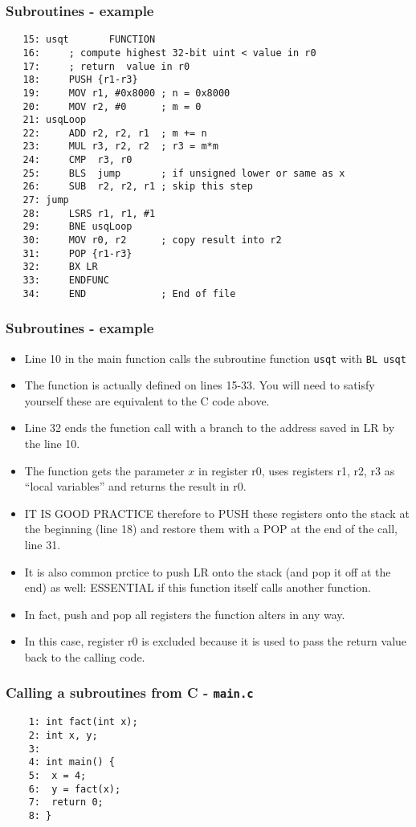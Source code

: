\documentclass[10pt]{beamer}
\begin{document}
\begin{frame} [fragile]
\frametitle{Subroutines - example}
\color{brown}
\begin{verbatim}
   15: usqt       FUNCTION
   16:     ; compute highest 32-bit uint < value in r0
   17:     ; return  value in r0
   18:     PUSH {r1-r3}
   19:     MOV r1, #0x8000 ; n = 0x8000
   20:     MOV r2, #0      ; m = 0
   21: usqLoop
   22:     ADD r2, r2, r1  ; m += n
   23:     MUL r3, r2, r2  ; r3 = m*m
   24:     CMP  r3, r0
   25:     BLS  jump       ; if unsigned lower or same as x
   26:     SUB  r2, r2, r1 ; skip this step
   27: jump
   28:     LSRS r1, r1, #1
   29:     BNE usqLoop
   30:     MOV r0, r2      ; copy result into r2
   31:     POP {r1-r3}
   32:     BX LR
   33:     ENDFUNC	 
   34:     END             ; End of file
\end{verbatim}
\end{frame}

\begin{frame} [fragile]
\frametitle{Subroutines - example}
\begin{itemize}
\item Line 10 in the main function calls the subroutine function \texttt{\color{brown}usqt} with \texttt{BL usqt}
\item The function is actually defined on lines 15-33. You will need to satisfy yourself these are equivalent to the C code above.
\item Line 32 ends the function call with a branch to the address saved in LR by the line 10.
\item The function gets the parameter $x$ in register r0, uses registers r1, r2, r3 as ``local variables'' and returns the result in r0.
\item IT IS GOOD PRACTICE therefore to PUSH these registers onto the stack at the beginning (line 18) and restore them with a POP at the end of the call, line 31.
\item It is also common prctice to push LR onto the stack (and pop it off at the end) as well: ESSENTIAL if this function itself calls another function.
\item In fact, {\color{brown}push and pop all registers the function alters in any way}.
\item In this case, register r0 is excluded because it is used to pass the return value back to the calling code.  
\end{itemize}
\end{frame}

\begin{frame} [fragile]
\frametitle{Calling a subroutines from C - \texttt{main.c}}
\color{brown}
\begin{verbatim}
    1: int fact(int x);
    2: int x, y;
    3: 
    4: int main() {
    5: 	x = 4;
    6: 	y = fact(x);
    7: 	return 0;
    8: }
\end{verbatim}
\end{frame}
\end{document}
